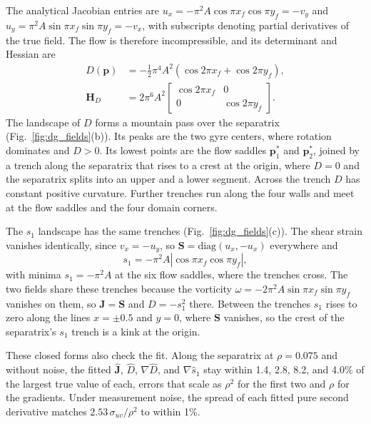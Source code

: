 \documentclass[lettersize,journal]{IEEEtran}
\newcommand{\rev}[1]{#1}
\begin{document}
The analytical Jacobian entries are
$u_x = -\pi^2 A \cos\pi x_f \cos\pi y_f = -v_y$ and
$u_y = \pi^2 A \sin\pi x_f \sin\pi y_f = -v_x$, with subscripts denoting
partial derivatives of the true field. The flow is therefore
incompressible, and its determinant and Hessian are
\begin{equation}
\begin{aligned}
D(\mathbf{p}) &= -\tfrac{1}{2}\pi^4 A^2 \left(\cos 2\pi x_f + \cos 2\pi y_f\right),\\
\mathbf{H}_D &= 2\pi^6 A^2
\begin{bmatrix} \cos 2\pi x_f & 0 \\ 0 & \cos 2\pi y_f \end{bmatrix}.
\end{aligned}
\label{eq:det_analytic_main}
\end{equation}
The landscape of $D$ forms a mountain pass over the separatrix
(Fig.~\ref{fig:dg_fields}(b)). Its peaks are the two gyre centers, where
rotation dominates and $D > 0$. Its lowest points are the flow saddles
$\mathbf{p}_1^*$ and $\mathbf{p}_2^*$, joined by a trench along the
separatrix that rises to a crest at the origin, where $D = 0$ and the
separatrix splits into an upper and a lower segment. Across the trench
$D$ has constant positive curvature. Further trenches run along the four
walls and meet at the flow saddles and the four domain corners.

The $s_1$ landscape has the same trenches (Fig.~\ref{fig:dg_fields}(c)).
The shear strain vanishes identically, since $v_x = -u_y$, so
$\mathbf{S} = \mathrm{diag}(u_x, -u_x)$ everywhere and
\begin{equation}
s_1 = -\pi^2 A \left|\cos\pi x_f \cos\pi y_f\right|,
\label{eq:s1_analytic_main}
\end{equation}
with minima $s_1 = -\pi^2 A$ at the six flow saddles, where the trenches
cross. The two fields share these trenches because the vorticity
$\omega = -2\pi^2 A \sin\pi x_f \sin\pi y_f$ vanishes on them, so
$\mathbf{J} = \mathbf{S}$ and $D = -s_1^2$ there. Between the trenches
$s_1$ rises to zero along the lines $x = \pm 0.5$ and $y = 0$, where
$\mathbf{S}$ vanishes, so the crest of the separatrix's $s_1$ trench is a
kink at the origin.

These closed forms also check the fit. Along the separatrix at
$\rho = 0.075$ and without noise, the fitted $\hat{\mathbf{J}}$, $\hat{D}$,
$\nabla\hat{D}$, and $\nabla\hat{s}_1$ stay within \rev{1.4},
\rev{2.8}, \rev{8.2}, and \rev{4.0}\% of the largest true value of each,
errors that scale as $\rho^2$ for the first two and $\rho$ for the
gradients. Under measurement noise, the spread of each fitted pure second
derivative matches $2.53\,\sigma_{uv}/\rho^2$ to within \rev{1}\%.
\end{document}
